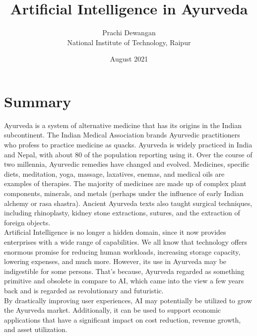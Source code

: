 \documentclass{article}
\title{\textbf{ Artificial Intelligence in Ayurveda}}
\author{Prachi Dewangan \\ National Institute of Technology, Raipur}
\date{August 2021}
\begin{document}
	\maketitle
	\section*{Summary}
	Ayurveda is a system of alternative medicine that has its origins in the Indian subcontinent. The Indian Medical Association brands Ayurvedic practitioners who profess to practice medicine as quacks. Ayurveda is widely practiced in India and Nepal, with about 80 of the population reporting using it. Over the course of two millennia, Ayurvedic remedies have changed and evolved. Medicines, specific diets, meditation, yoga, massage, laxatives, enemas, and medical oils are examples of therapies. The majority of medicines are made up of complex plant components, minerals, and metals (perhaps under the influence of early Indian alchemy or rasa shastra). Ancient Ayurveda texts also taught surgical techniques, including rhinoplasty, kidney stone extractions, sutures, and the extraction of foreign objects.\\
	
	
	Artificial Intelligence is no longer a hidden domain, since it now provides enterprises with a wide range of capabilities. We all know that technology offers enormous promise for reducing human workloads, increasing storage capacity, lowering expenses, and much more. However, its use in Ayurveda may be indigestible for some persons. That’s because, Ayurveda regarded as something primitive and obsolete in compare to AI, which came into the view a few years back and is regarded as revolutionary and futuristic. \\
By drastically improving user experiences, AI may potentially be utilized to grow the Ayurveda market. Additionally, it can be used to support economic applications that have a significant impact on cost reduction, revenue growth, and asset utilization. \\
	
\end{document}
